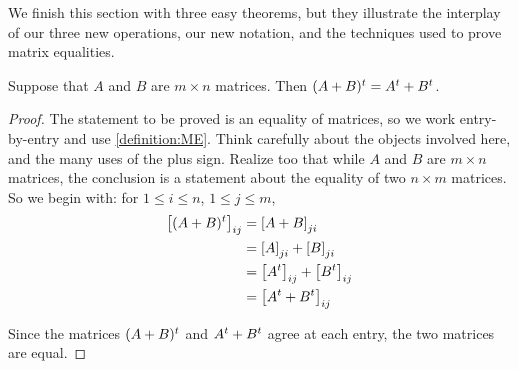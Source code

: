\documentclass{ximera}
\begin{document}
We finish this section with three easy theorems, but they illustrate the interplay of our three new operations, our new notation, and the techniques used to prove matrix equalities.

\begin{theorem}
  \label{theorem:TMA}

  Suppose that $A$ and $B$ are $m\times n$ matrices.  Then  $(A+B)^{t}=A^{t}+B^{t}$.

  \begin{proof}
    The statement to be proved is an equality of matrices, so we work
    entry-by-entry and use \ref{definition:ME}.  Think carefully about
    the objects involved here, and the many uses of the plus sign.
    Realize too that while $A$ and $B$ are $m\times n$ matrices, the
    conclusion is a statement about the equality of two $n\times m$
    matrices.  So we begin with: for $1\leq i\leq n$, $1\leq j\leq m$,
    \begin{align*}
      \matrixentry{\transpose{(A+B)}}{ij}
      &=\matrixentry{A+B}{ji}\\ %
      &=\matrixentry{A}{ji}+\matrixentry{B}{ji}\\ %
      &=\matrixentry{\transpose{A}}{ij}+\matrixentry{\transpose{B}}{ij}\\ %
      &=\matrixentry{\transpose{A}+\transpose{B}}{ij}\\ %
    \end{align*}
    
    Since the matrices $(A+B)^{t}$ and
    $A^{t}+B^{t}$ agree at each entry,
    the two matrices are equal.
\end{proof}
\end{theorem}
\end{document}
